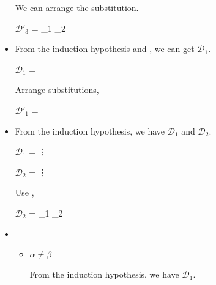 \begin{itemize}
	      We can arrange the substitution.
	      	      	      	      
	      $\mathcal{D}'_3$ = 
	      {_1 \andalso {}_2}
	      	      	      	      
	\item \KApp
	      	      	      	      
	      From the induction hypothesis and \KApp, we can get $\mathcal{D}_1$.
	      	      	      	      
	      $\mathcal{D}_1$ = 
	      { \andalso {}}
	      	      	      	      
	      Arrange substitutions,
	      	      	      	      
	      $\mathcal{D}'_1$ = 
	      { \andalso {}}
	      	      	      	      
	\item \KConv
	      	      	      	      
	      From the induction hypothesis, we have $\mathcal{D}_1$ and $\mathcal{D}_2$.
	      	      	      	      
	      $\mathcal{D}_1$ = 
	      {\vdots}
	      	      	      	      
	      $\mathcal{D}_2$ = 
	      {\vdots}
	      	      	      	      
	      Use \KConv,
	      	      	      	      
	      $\mathcal{D}_2$ = 
	      {_1 \andalso {}_2}
	      	      	      	      
	\item \KTW
	      	      	      	      
	      \begin{itemize}
	      		      		      		      	
	      	\item $\alpha \neq \beta$
	      	      	      	      	      	      	      	      
	      	      From the induction hypothesis, we have $\mathcal{D}_1$.
	      	      	      	      	      	      	      	      

\end{itemize}
\end{itemize}
